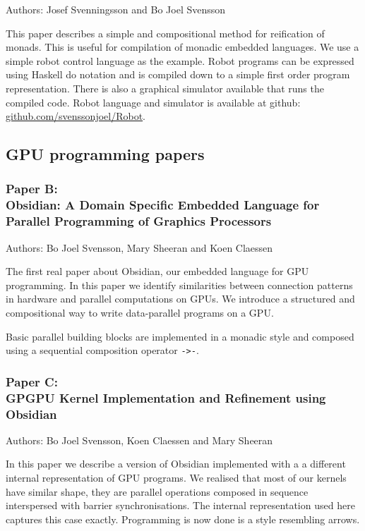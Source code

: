 \documentclass[a4paper]{book}
\newcommand{\paperB}{Paper B}
\newcommand{\paperBTitle}{Obsidian: A Domain Specific Embedded Language for Parallel Programming of Graphics Processors}
\newcommand{\paperC}{Paper C}
\newcommand{\paperCTitle}{GPGPU Kernel Implementation and Refinement using Obsidian}
\begin{document}
Authors: Josef Svenningsson and Bo Joel Svensson 

\vspace{5mm}

\noindent This paper describes a simple and compositional method for 
reification of monads. This is useful for compilation of 
monadic embedded languages. We use a simple robot control language 
as the example. Robot programs can be expressed using Haskell do notation 
and is compiled down to a simple first order program representation. 
There is also a graphical simulator available that runs the compiled 
code. Robot language and simulator is available at github: \url{github.com/svenssonjoel/Robot}.

\subsection{GPU programming papers} 

\subsubsection{\paperB: \\ \paperBTitle}

Authors: Bo Joel Svensson, Mary Sheeran and Koen Claessen \newline

\vspace{5mm}

The first real paper about Obsidian, our embedded language for GPU 
programming. In this paper we identify similarities between 
connection patterns in hardware and parallel computations on GPUs. 
We introduce a structured and compositional way to write data-parallel 
programs on a GPU.

Basic parallel building blocks are implemented in a monadic style and 
composed using a sequential composition operator {\tt ->-}. 

\subsubsection{\paperC: \\ \paperCTitle}

Authors: Bo Joel Svensson, Koen Claessen and Mary Sheeran \newline

\vspace{5mm}

In this paper we describe a version of Obsidian implemented with a 
a different internal representation of GPU programs. We realised that 
most of our kernels have similar shape, they are parallel operations 
composed in sequence interspersed with barrier synchronisations. The 
internal representation used here captures this case exactly. Programming 
is now done is a style resembling arrows. 
\end{document}
